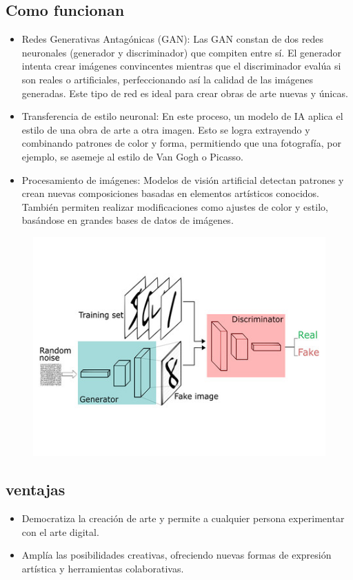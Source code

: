 \documentclass[12pt]{article}
\begin{document}
\subsection{Como funcionan}
\begin{itemize}
    \item Redes Generativas Antagónicas (GAN): 
    Las GAN constan de dos redes neuronales (generador y discriminador) que compiten entre sí. El generador intenta crear imágenes 
    convincentes mientras que el discriminador evalúa si son reales o artificiales, perfeccionando así la calidad de las imágenes generadas. 
    Este tipo de red es ideal para crear obras de arte nuevas y únicas.
    \item Transferencia de estilo neuronal: 
    En este proceso, un modelo de IA aplica el estilo de una obra de arte a otra imagen. 
    Esto se logra extrayendo y combinando patrones de color y forma, permitiendo que una fotografía, 
    por ejemplo, se asemeje al estilo de Van Gogh o Picasso.

\clearpage

    \item Procesamiento de imágenes:
    Modelos de visión artificial detectan patrones y crean nuevas composiciones basadas en elementos artísticos conocidos. 
    También permiten realizar modificaciones como ajustes de color y estilo, basándose en grandes bases de datos de imágenes.
\end{itemize}

\begin{figure}[h!]
    \centering
    \includegraphics[width=.6\textwidth]{GAN.jpg}
    \label{fig:my_label}
\end{figure}


\subsection{ventajas}
\begin{itemize}
    \item Democratiza la creación de arte y permite a cualquier persona experimentar con el arte digital.
    \item Amplía las posibilidades creativas, ofreciendo nuevas formas de expresión artística y herramientas colaborativas.
\end{itemize}
\end{document}
